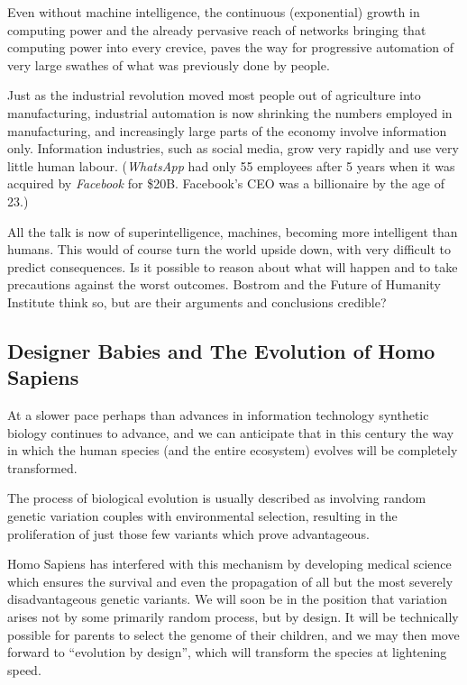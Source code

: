 \documentclass[12pt,titlepage]{article}
\begin{document}
{Even without machine intelligence, the continuous (exponential)
growth in computing power and the already pervasive reach of
networks bringing that computing power into every crevice, paves
the way for progressive automation of very large swathes of what
was previously done by people.

Just as the industrial revolution moved most people out of
agriculture into manufacturing, industrial automation is now
shrinking the numbers employed in manufacturing, and increasingly
large parts of the economy involve information only.
Information industries, such as social media, grow very rapidly
and use very little human labour.
(\emph{WhatsApp} had only 55 employees after 5 years when it was
acquired by \emph{Facebook} for \$20B.
Facebook's CEO was a billionaire by the age of 23.)

All the talk is now of superintelligence, machines, becoming more
intelligent than humans.
This would of course turn the world upside down, with very difficult
to predict consequences.
Is it possible to reason about what will happen and to take precautions against
the worst outcomes.
Bostrom and the Future of Humanity Institute think so, but are their
arguments and conclusions credible?

\subsection{Designer Babies and The Evolution of Homo Sapiens}

At a slower pace perhaps than advances in information technology synthetic
biology continues to advance, and we can anticipate that in this century
the way in which the human species (and the entire ecosystem) evolves will
be completely transformed.

The process of biological evolution is usually described as involving
random genetic variation couples with environmental selection, resulting
in the proliferation of just those few variants which prove advantageous.

Homo Sapiens has interfered with this mechanism by developing medical
science which ensures the survival and even the propagation of all but the
most severely disadvantageous genetic variants.
We will soon be in the position that variation arises not by some primarily
random process, but by design.
It will be technically possible for parents to select the genome of their
children, and we may then move forward to ``evolution by design'', which
will transform the species at lightening speed.

}
\end{document}
